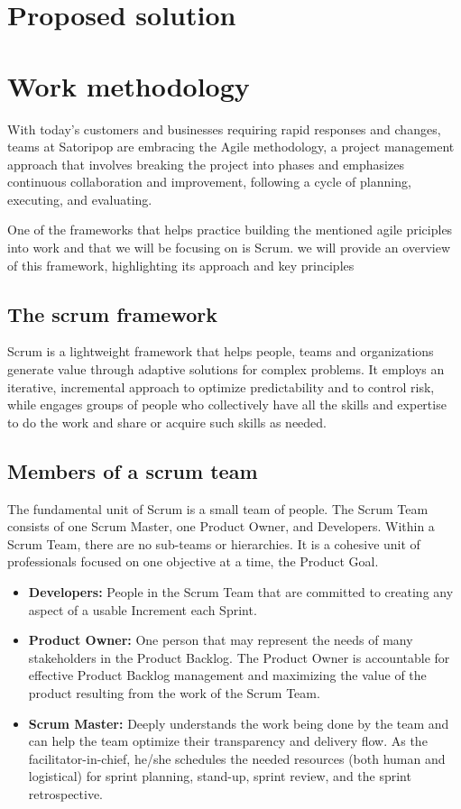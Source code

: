 \section{Proposed solution}

\section{Work methodology}
With today’s customers and businesses requiring rapid responses and changes, teams at Satoripop are embracing 
the Agile methodology, a project management approach that involves breaking the project into phases 
and emphasizes continuous collaboration and improvement, following a cycle of planning, executing, 
and evaluating. 

One of the frameworks that helps practice building the mentioned agile priciples into work and that we will 
be focusing on is Scrum. we will provide an overview of this framework, highlighting its approach and 
key principles

\subsection{The scrum framework}
Scrum is a lightweight framework that helps people, teams and organizations generate value through adaptive 
solutions for complex problems. It employs an iterative, incremental approach to optimize predictability 
and to control risk, while engages groups of people who collectively have all the skills and expertise 
to do the work and share or acquire such skills as needed.

\subsection{Members of a scrum team }
The fundamental unit of Scrum is a small team of people. The Scrum Team consists of
one Scrum Master, one Product Owner, and Developers. Within a Scrum Team, there are no sub-teams
or hierarchies. It is a cohesive unit of professionals focused on one objective at a time, 
the Product Goal. \cite{scrumguides}

\begin{itemize}
    \item \textbf{Developers:} People in the Scrum Team that are committed to creating any aspect 
    of a usable Increment each Sprint.
    \item \textbf{Product Owner:} One person that may represent the needs of many stakeholders
    in the Product Backlog. The Product Owner is accountable for effective Product Backlog management 
    and maximizing the value of the product resulting from the work of the Scrum Team.
    \item \textbf{Scrum Master:} Deeply understands the work being done by the team and 
    can help the team optimize their transparency and delivery flow. As the facilitator-in-chief, 
    he/she schedules the needed resources (both human and logistical) for sprint planning, stand-up, 
    sprint review, and the sprint retrospective.
\end{itemize}
\raggedbottom

